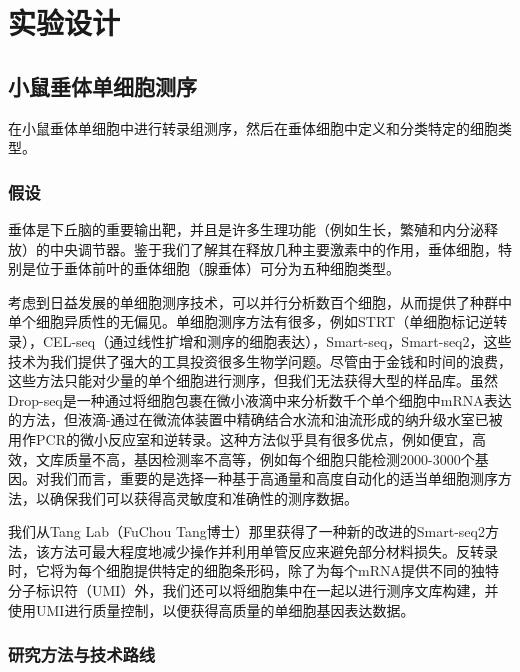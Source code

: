 
\chapter{实验设计}

\section{小鼠垂体单细胞测序}
  在小鼠垂体单细胞中进行转录组测序，然后在垂体细胞中定义和分类特定的细胞类型。
\subsection{假设}
  垂体是下丘脑的重要输出靶，并且是许多生理功能（例如生长，繁殖和内分泌释放）的中央调节器。鉴于我们了解其在释放几种主要激素中的作用，垂体细胞，特别是位于垂体前叶的垂体细胞（腺垂体）可分为五种细胞类型。

  考虑到日益发展的单细胞测序技术，可以并行分析数百个细胞，从而提供了种群中单个细胞异质性的无偏见。单细胞测序方法有很多，例如STRT（单细胞标记逆转录），CEL-seq（通过线性扩增和测序的细胞表达），Smart-seq，Smart-seq2，这些技术为我们提供了强大的工具投资很多生物学问题。尽管由于金钱和时间的浪费，这些方法只能对少量的单个细胞进行测序，但我们无法获得大型的样品库。虽然Drop-seq是一种通过将细胞包裹在微小液滴中来分析数千个单个细胞中mRNA表达的方法，但液滴-通过在微流体装置中精确结合水流和油流形成的纳升级水室已被用作PCR的微小反应室和逆转录。这种方法似乎具有很多优点，例如便宜，高效，文库质量不高，基因检测率不高等，例如每个细胞只能检测2000-3000个基因。对我们而言，重要的是选择一种基于高通量和高度自动化的适当单细胞测序方法，以确保我们可以获得高灵敏度和准确性的测序数据。

  我们从Tang Lab（FuChou Tang博士）那里获得了一种新的改进的Smart-seq2方法，该方法可最大程度地减少操作并利用单管反应来避免部分材料损失。反转录时，它将为每个细胞提供特定的细胞条形码，除了为每个mRNA提供不同的独特分子标识符（UMI）外，我们还可以将细胞集中在一起以进行测序文库构建，并使用UMI进行质量控制，以便获得高质量的单细胞基因表达数据。
\subsection{研究方法与技术路线}
